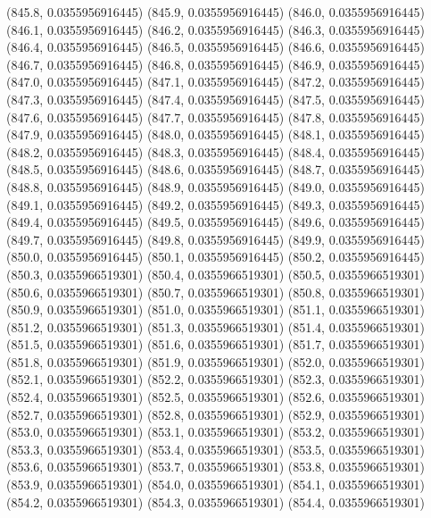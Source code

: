 {					(845.8, 0.0355956916445)
					(845.9, 0.0355956916445)
					(846.0, 0.0355956916445)
					(846.1, 0.0355956916445)
					(846.2, 0.0355956916445)
					(846.3, 0.0355956916445)
					(846.4, 0.0355956916445)
					(846.5, 0.0355956916445)
					(846.6, 0.0355956916445)
					(846.7, 0.0355956916445)
					(846.8, 0.0355956916445)
					(846.9, 0.0355956916445)
					(847.0, 0.0355956916445)
					(847.1, 0.0355956916445)
					(847.2, 0.0355956916445)
					(847.3, 0.0355956916445)
					(847.4, 0.0355956916445)
					(847.5, 0.0355956916445)
					(847.6, 0.0355956916445)
					(847.7, 0.0355956916445)
					(847.8, 0.0355956916445)
					(847.9, 0.0355956916445)
					(848.0, 0.0355956916445)
					(848.1, 0.0355956916445)
					(848.2, 0.0355956916445)
					(848.3, 0.0355956916445)
					(848.4, 0.0355956916445)
					(848.5, 0.0355956916445)
					(848.6, 0.0355956916445)
					(848.7, 0.0355956916445)
					(848.8, 0.0355956916445)
					(848.9, 0.0355956916445)
					(849.0, 0.0355956916445)
					(849.1, 0.0355956916445)
					(849.2, 0.0355956916445)
					(849.3, 0.0355956916445)
					(849.4, 0.0355956916445)
					(849.5, 0.0355956916445)
					(849.6, 0.0355956916445)
					(849.7, 0.0355956916445)
					(849.8, 0.0355956916445)
					(849.9, 0.0355956916445)
					(850.0, 0.0355956916445)
					(850.1, 0.0355956916445)
					(850.2, 0.0355956916445)
					(850.3, 0.0355966519301)
					(850.4, 0.0355966519301)
					(850.5, 0.0355966519301)
					(850.6, 0.0355966519301)
					(850.7, 0.0355966519301)
					(850.8, 0.0355966519301)
					(850.9, 0.0355966519301)
					(851.0, 0.0355966519301)
					(851.1, 0.0355966519301)
					(851.2, 0.0355966519301)
					(851.3, 0.0355966519301)
					(851.4, 0.0355966519301)
					(851.5, 0.0355966519301)
					(851.6, 0.0355966519301)
					(851.7, 0.0355966519301)
					(851.8, 0.0355966519301)
					(851.9, 0.0355966519301)
					(852.0, 0.0355966519301)
					(852.1, 0.0355966519301)
					(852.2, 0.0355966519301)
					(852.3, 0.0355966519301)
					(852.4, 0.0355966519301)
					(852.5, 0.0355966519301)
					(852.6, 0.0355966519301)
					(852.7, 0.0355966519301)
					(852.8, 0.0355966519301)
					(852.9, 0.0355966519301)
					(853.0, 0.0355966519301)
					(853.1, 0.0355966519301)
					(853.2, 0.0355966519301)
					(853.3, 0.0355966519301)
					(853.4, 0.0355966519301)
					(853.5, 0.0355966519301)
					(853.6, 0.0355966519301)
					(853.7, 0.0355966519301)
					(853.8, 0.0355966519301)
					(853.9, 0.0355966519301)
					(854.0, 0.0355966519301)
					(854.1, 0.0355966519301)
					(854.2, 0.0355966519301)
					(854.3, 0.0355966519301)
					(854.4, 0.0355966519301)
}
